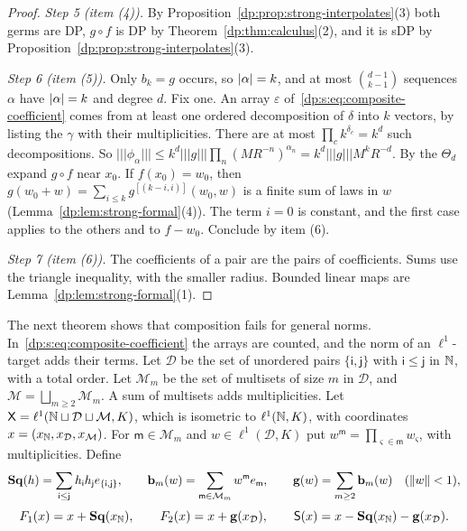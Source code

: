 \begin{proof}
\emph{Step 5 (item (4)).} By Proposition~\ref{dp:prop:strong-interpolates}(3) both germs are DP, $g\circ f$ is DP by Theorem~\ref{dp:thm:calculus}(2), and it is sDP by Proposition~\ref{dp:prop:strong-interpolates}(3).

\emph{Step 6 (item (5)).} Only $b_k=g$ occurs, so $\lvert \alpha\rvert=k$, and at most $\binom{d-1}{k-1}$ sequences $\alpha$ have $\lvert \alpha\rvert=k$ and degree $d$. Fix one. An array $\varepsilon$ of~\eqref{dp:s:eq:composite-coefficient} comes from at least one ordered decomposition of $\delta$ into $k$ vectors, by listing the $\gamma$ with their multiplicities. There are at most $\prod_ck^{\delta_c}=k^d$ such decompositions. So $\lvert\!\lvert\!\lvert \phi_\alpha\rvert\!\rvert\!\rvert\le k^d\lvert\!\lvert\!\lvert g\rvert\!\rvert\!\rvert\prod_n(MR^{-n})^{\alpha_n}=k^d\lvert\!\lvert\!\lvert g\rvert\!\rvert\!\rvert M^kR^{-d}$. By \cite[Lemma~Q.3]{I} the $\Theta_d$ expand $g\circ f$ near $x_0$. If $f(x_0)=w_0$, then $g(w_0+w)=\sum_{i\le k}g^{[(k-i,i)]}(w_0,w)$ is a finite sum of laws in $w$ (Lemma~\ref{dp:lem:strong-formal}(4)). The term $i=0$ is constant, and the first case applies to the others and to $f-w_0$. Conclude by item (6).

\emph{Step 7 (item (6)).} The coefficients of a pair are the pairs of coefficients. Sums use the triangle inequality, with the smaller radius. Bounded linear maps are Lemma~\ref{dp:lem:strong-formal}(1).
\end{proof}

The next theorem shows that composition fails for general norms. In~\eqref{dp:s:eq:composite-coefficient} the arrays are counted, and the norm of an $\ell^1$-target adds their terms. Let $\mathcal D$ be the set of unordered pairs $\{\mathsf i,\mathsf j\}$ with $\mathsf i\le\mathsf j$ in $\mathbb N$, with a total order. Let $\mathcal M_m$ be the set of multisets of size $m$ in $\mathcal D$, and $\mathcal M=\bigsqcup_{m\ge2}\mathcal M_m$. A sum of multisets adds multiplicities. Let $\mathsf X=\ell^1(\mathbb N\sqcup\mathcal D\sqcup\mathcal M,K)$, which is isometric to $\ell^1(\mathbb N,K)$, with coordinates $x=(x_\mathbb N,x_{\mathcal D},x_{\mathcal M})$. For $\mathsf m\in\mathcal M_m$ and $w\in\ell^1(\mathcal D,K)$ put $w^{\mathsf m}=\prod_{\varsigma\in\mathsf m}w_\varsigma$, with multiplicities. Define
\[
 \mathbf{Sq}(h)=\sum_{\mathsf i\le\mathsf j}h_{\mathsf i}h_{\mathsf j}e_{\{\mathsf i,\mathsf j\}},\qquad\mathbf b_m(w)=\sum_{\mathsf m\in\mathcal M_m}w^{\mathsf m}e_{\mathsf m},\qquad\mathbf g(w)=\sum_{m\ge2}\mathbf b_m(w)\quad(\lVert w\rVert<1),
\]
\[
 F_1(x)=x+\mathbf{Sq}(x_\mathbb N),\qquad F_2(x)=x+\mathbf g(x_{\mathcal D}),\qquad\mathsf S(x)=x-\mathbf{Sq}(x_\mathbb N)-\mathbf g(x_{\mathcal D}).
\]

